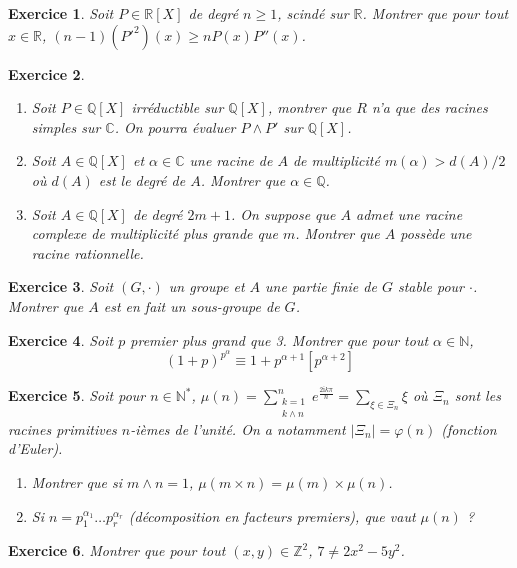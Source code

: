 \documentclass[12pt]{article}
\newtheorem{exercise}{Exercice}[section]
\theoremstyle{remark}
\theoremstyle{remark}
\newcommand{\R}{\mathbb{R}}
\newcommand{\C}{\mathbb{C}}
\newcommand{\Q}{\mathbb{Q}}
\newcommand{\N}{\mathbb{N}}
\newcommand{\Z}{\mathbb{Z}}
\begin{document}
\begin{exercise}
	Soit $P\in\R[X]$ de degré $n\geqslant1$, scindé sur $\R$. Montrer que pour
	tout $x\in\R$, $(n-1)(P'^{2})(x)\geqslant nP(x)P''(x)$.
\end{exercise}

\begin{exercise}
	\phantom{}
	\begin{enumerate}
		\item Soit $P\in\Q[X]$ irréductible sur $\Q[X]$, montrer que $R$ n'a que
		des racines simples sur $\C$. On pourra évaluer $P\wedge P'$ sur
		$\Q[X]$.
		\item Soit $A\in\Q[X]$ et $\alpha\in\C$ une racine de $A$ de
		multiplicité $m(\alpha)>d(A)/2$ où $d(A)$ est le degré de $A$. Montrer
		que $\alpha\in\Q$.
		\item Soit $A\in\Q[X]$ de degré $2m+1$. On suppose que $A$ admet une
		racine complexe de multiplicité plus grande que $m$. Montrer que $A$
		possède une racine rationnelle.
	\end{enumerate}
\end{exercise}

\begin{exercise}
	Soit $(G,\cdot)$ un groupe et $A$ une partie finie de $G$ stable pour
	$\cdot$. Montrer que $A$ est en fait un sous-groupe de $G$.
\end{exercise}

\begin{exercise}
	Soit $p$ premier plus grand que 3. Montrer que pour tout $\alpha\in\N$,
	$$(1+p)^{p^{\alpha}}\equiv 1+p^{\alpha+1}[p^{\alpha+2}]$$
\end{exercise}

\begin{exercise}
	Soit pour $n\in\N^{*}$, $\mu(n)=\sum_{\substack{k=1\\k\wedge
	n}}^{n}e^{\frac{2\mathrm{i}k\pi}{n}}=\sum_{\xi\in\Xi_{n}}\xi$ où $\Xi_{n}$
	sont les racines primitives $n$-ièmes de l'unité. On a notamment
	$\vert\Xi_{n}\vert=\varphi(n)$ (fonction d'Euler).
	\begin{enumerate}
		\item Montrer que si $m\wedge n=1$, $\mu(m\times n)=\mu(m)\times\mu(n)$.
		\item Si $n=p_{1}^{\alpha_{1}}\dots p_{r}^{\alpha_{r}}$ (décomposition
		en facteurs premiers), que vaut $\mu(n)$ ?
	\end{enumerate}
\end{exercise}

\begin{exercise}
	Montrer que pour tout $(x,y)\in\Z^{2}$, $7\neq 2x^{2}-5y^{2}$.
\end{exercise}
\end{document}
